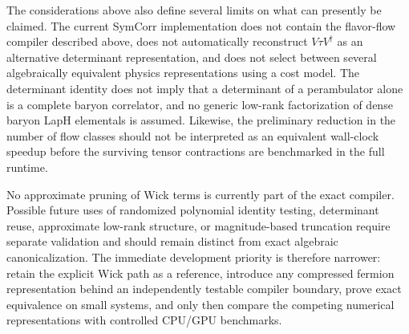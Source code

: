 The considerations above also define several limits on what can presently be
claimed. The current SymCorr implementation does not contain the flavor-flow
compiler described above, does not automatically reconstruct
\(V\tau V^\dagger\) as an alternative determinant representation, and does not
select between several algebraically equivalent physics representations using a
cost model. The determinant identity does not imply that a determinant of a
perambulator alone is a complete baryon correlator, and no generic low-rank
factorization of dense baryon LapH elementals is assumed. Likewise, the
preliminary reduction in the number of flow classes should not be interpreted
as an equivalent wall-clock speedup before the surviving tensor contractions
are benchmarked in the full runtime.

No approximate pruning of Wick terms is currently part of the exact compiler.
Possible future uses of randomized polynomial identity testing, determinant
reuse, approximate low-rank structure, or magnitude-based truncation require
separate validation and should remain distinct from exact algebraic
canonicalization. The immediate development priority is therefore narrower:
retain the explicit Wick path as a reference, introduce any compressed fermion
representation behind an independently testable compiler boundary, prove exact
equivalence on small systems, and only then compare the competing numerical
representations with controlled CPU/GPU benchmarks.
